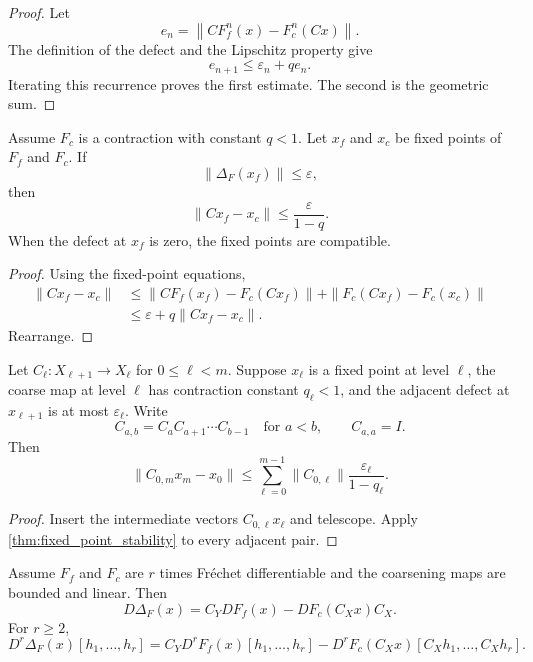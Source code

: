 \begin{proof}
Let
\[
e_n=\left\|CF_f^n(x)-F_c^n(Cx)\right\|.
\]
The definition of the defect and the Lipschitz property give
\[
e_{n+1}\le\varepsilon_n+qe_n.
\]
Iterating this recurrence proves the first estimate.  The second is the geometric sum.
\end{proof}

\begin{theorem}\label{thm:fixed_point_stability}
Assume $F_c$ is a contraction with constant $q<1$.  Let $x_f$ and $x_c$ be fixed points of $F_f$ and $F_c$.  If
\[
\|\Delta_F(x_f)\|\le\varepsilon,
\]
then
\[
\|Cx_f-x_c\|
\le
\frac{\varepsilon}{1-q}.
\]
When the defect at $x_f$ is zero, the fixed points are compatible.
\end{theorem}

\begin{proof}
Using the fixed-point equations,
\[
\begin{aligned}
\|Cx_f-x_c\|
&\le
\|CF_f(x_f)-F_c(Cx_f)\|
+
\|F_c(Cx_f)-F_c(x_c)\|\\
&\le
\varepsilon+q\|Cx_f-x_c\|.
\end{aligned}
\]
Rearrange.
\end{proof}

\begin{corollary}\label{cor:multilevel_fixed_points}
Let $C_\ell:X_{\ell+1}\to X_\ell$ for $0\le\ell<m$.  Suppose $x_\ell$ is a fixed point at level $\ell$, the coarse map at level $\ell$ has contraction constant $q_\ell<1$, and the adjacent defect at $x_{\ell+1}$ is at most $\varepsilon_\ell$.  Write
\[
C_{a,b}=C_aC_{a+1}\cdots C_{b-1}
\quad\text{for }a<b,
\qquad
C_{a,a}=I.
\]
Then
\[
\|C_{0,m}x_m-x_0\|
\le
\sum_{\ell=0}^{m-1}
\|C_{0,\ell}\|
\frac{\varepsilon_\ell}{1-q_\ell}.
\]
\end{corollary}

\begin{proof}
Insert the intermediate vectors $C_{0,\ell}x_\ell$ and telescope.  Apply \cref{thm:fixed_point_stability} to every adjacent pair.
\end{proof}

\begin{proposition}\label{prop:derivative_defects}
Assume $F_f$ and $F_c$ are $r$ times Fr\'echet differentiable and the coarsening maps are bounded and linear.  Then
\[
D\Delta_F(x)
=
C_YDF_f(x)-DF_c(C_Xx)C_X.
\]
For $r\ge2$,
\[
D^r\Delta_F(x)[h_1,\ldots,h_r]
=
C_YD^rF_f(x)[h_1,\ldots,h_r]
-
D^rF_c(C_Xx)[C_Xh_1,\ldots,C_Xh_r].
\]
\end{proposition}

